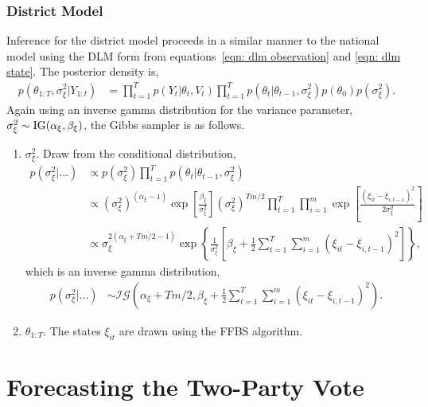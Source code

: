 \documentclass[12pt,final,fleqn]{article}
\theoremstyle{plain}
\begin{document}
\subsubsection{District Model}
Inference for the district model proceeds in a similar manner to the national model using the DLM form from equations~\ref{eqn: dlm observation} and \ref{eqn: dlm state}. The posterior density is,
\begin{align}
p(\theta_{1:T}, \sigma^2_{\xi}|Y_{1:t}) &= \prod_{t=1}^T p(Y_t|\theta_t, V_t)\prod_{t=1}^T p(\theta_t|\theta_{t-1}, \sigma^2_\xi) p(\theta_0) p(\sigma^2_\xi).
\end{align}
Again using an inverse gamma distribution for the variance parameter, $\sigma^2_\xi \sim \rm{IG}(\alpha_\xi, \beta_\xi)$, the Gibbs sampler is as follows.
\begin{enumerate}
\item $\sigma_\xi^2$. Draw from the conditional distribution,
\begin{align}
p(\sigma_\xi^2|\ldots)&\propto p(\sigma_\xi^2) \prod_{t=1}^T p(\theta_{t}|\theta_{t-1}, \sigma_\xi^2) \\
&\propto (\sigma_\xi^2)^{(\alpha_\xi - 1)}\exp\left[\frac{\beta_\xi}{\sigma_\xi^2}\right](\sigma_\xi^2)^{Tm/2} \prod_{t=1}^T \prod_{i=1}^m \exp\left[\frac{(\xi_{it} - \xi_{i,t-1})^2}{2\sigma_\xi^2}\right]\\
&\propto \sigma_\xi^{2(\alpha_\xi + Tm/2 - 1)}\exp\left\{\frac{1}{\sigma_\xi^2}\left[\beta_\xi + \frac{1}{2}\sum_{t=1}^T \sum_{i=1}^m (\xi_{it} - \xi_{i,t-1})^2\right]\right\},
\end{align}
which is an inverse gamma distribution,
\begin{align}
p(\sigma_\xi^2|\ldots)&\sim \mathcal{IG}\left(\alpha_\xi + Tm/2, \beta_\xi + \frac{1}{2}\sum_{t=1}^T \sum_{i=1}^m (\xi_{it} - \xi_{i,t-1})^2  \right).
\end{align}
\item $\theta_{1:T}$. The states $\xi_{it}$ are drawn using the FFBS algorithm.
\end{enumerate}

\section{Forecasting the Two-Party Vote}
\end{document}
